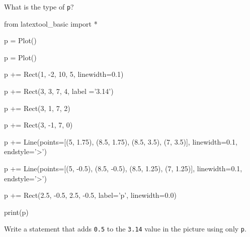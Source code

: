 What is the type of \texttt{p}?



\begin{python}

from latextool_basic import *

p = Plot()

p = Plot()

p += Rect(1, -2, 10, 5, linewidth=0.1)

p += Rect(3, 3, 7, 4, label ='3.14')

p += Rect(3, 1, 7, 2)

p += Rect(3, -1, 7, 0)

p += Line(points=[(5, 1.75), (8.5, 1.75), (8.5, 3.5), (7, 3.5)], linewidth=0.1, endstyle='>')

p += Line(points=[(5, -0.5), (8.5, -0.5), (8.5, 1.25), (7, 1.25)], linewidth=0.1, endstyle='>')

p += Rect(2.5, -0.5, 2.5, -0.5, label='p', linewidth=0.0)

print(p)

\end{python}





Write a statement that adds \texttt{0.5} to the \texttt{3.14} value in the picture using only \texttt{p}.

